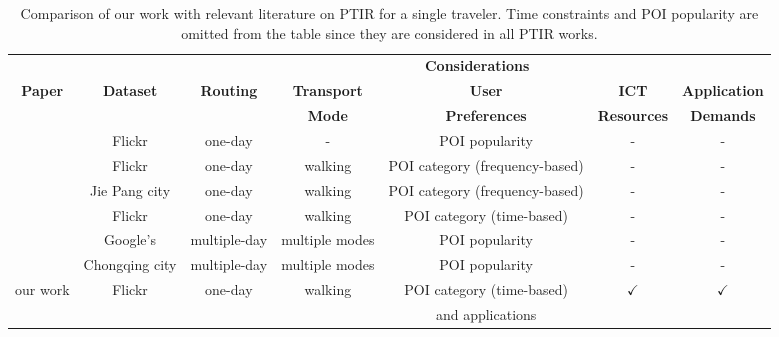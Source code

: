 \begin{table*}[t]
\centering

\footnotesize
\caption{Comparison of our work with relevant literature on PTIR for a single traveler. Time constraints and POI popularity are omitted from the table since they are considered in all PTIR works.}
\label{tab:related-work}
\begin{tabular}{ccccccc}\toprule
& &\multicolumn{5}{c}{\textbf{Considerations}} \\
\cmidrule(lr){3-7}
\textbf{Paper} & \textbf{Dataset} &
\textbf{Routing} & 
\textbf{Transport} & \textbf{User} & 
\textbf{ICT} &  \textbf{Application} 
\\
             &               &
             & 
\textbf{Mode} & \textbf{Preferences} & 
\textbf{Resources}  &  \textbf{Demands} \\
\midrule
\cite{choudhury-automatic:10} & Flickr &
one-day & 
- & POI popularity & 
- & - \\ \hline
\cite{brilhante-where:13} & Flickr & 
one-day & 
walking & POI category (frequency-based) & 
- & - \\ \hline
\cite{yu-personalized:16} & Jie Pang city & 
one-day & 
walking & POI category (frequency-based) & 
- & - \\ \hline
\cite{lim-personalized:18} & Flickr & 
one-day & 
walking & POI category (time-based) & 
- & - \\ \hline
\cite{friggstad:18} & Google's & 
multiple-day & 
multiple modes & POI popularity & 
- & - \\ \hline
\cite{zhong-optimization:23} & Chongqing city & 
multiple-day & 
multiple modes & POI popularity & 
- & - \\ \hline
our work & Flickr & 
one-day & 
walking & POI category (time-based) & 
$\checkmark$ & $\checkmark$ \\
  & & & & and applications & & \\\bottomrule
\end{tabular}
\end{table*}

